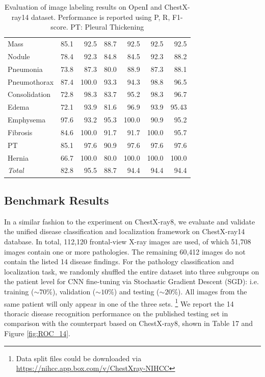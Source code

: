 \documentclass[10pt,twocolumn,letterpaper]{article}
\begin{document}
\begin{table}[t]
\begin{center}
\begin{tabular}{lr@{~/~}r@{~/~}rr@{~/~}r@{~/~}r}
			Mass & 85.1& 92.5& 88.7 & 92.5& 92.5& 92.5\\
			Nodule & 78.4& 92.3& 84.8  & 84.5& 92.3& 88.2\\
			Pneumonia & 73.8& 87.3& 80.0 & 88.9& 87.3& 88.1\\
			Pneumothorax & 87.4& 100.0& 93.3 & 94.3& 98.8& 96.5\\
			Consolidation & 72.8& 98.3& 83.7 & 95.2& 98.3& 96.7 \\
			Edema &72.1& 93.9& 81.6 & 96.9& 93.9& 95.43\\
			Emphysema & 97.6& 93.2& 95.3 &100.0& 90.9& 95.2\\
			Fibrosis & 84.6& 100.0& 91.7 &91.7& 100.0& 95.7\\
			PT & 85.1& 97.6& 90.9 &97.6& 97.6& 97.6 \\
			Hernia & 66.7 &100.0 &80.0  &100.0 &100.0 &100.0\\
			\hspace*{1em}\textit{Total} & 82.8 &95.5 &88.7 & 94.4 &94.4 &94.4\\
			\hline
		\end{tabular}
	\end{center}
	\caption{Evaluation of image labeling results on OpenI and ChestX-ray14 dataset. Performance is reported using P, R, F1-score. PT: Pleural Thickening}
	\label{tab:evaluation_openi_14}
\end{table}

\subsection{ Benchmark Results}
In a similar fashion to the experiment on ChestX-ray8, we evaluate and validate the unified disease classification and localization framework on ChestX-ray14 database. In total, 112,120 frontal-view X-ray images are used, of which 51,708 images contain one or more pathologies. The remaining 60,412 images do not contain the listed 14 disease findings. For the pathology classification and localization task, we randomly shuffled the entire dataset into three subgroups on the patient level for CNN fine-tuning via Stochastic Gradient Descent (SGD): i.e. training ($\sim70\%$), validation ($\sim10\%$) and testing ($\sim20\%$). All images from the same patient will only appear in one of the three sets.  \footnote{ Data split files could be downloaded via \url{https://nihcc.app.box.com/v/ChestXray-NIHCC}} We report the 14 thoracic disease recognition performance on the published testing set  in comparison with the counterpart based on ChestX-ray8, shown in Table {\color{red} 17} and Figure \ref{fig:ROC_14}. 
\end{document}
